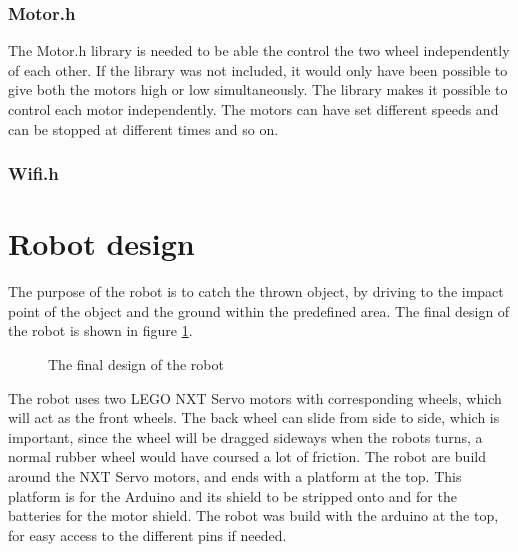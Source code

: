 \subsubsection{Motor.h}
\label{sec:Motor.h}
The Motor.h library is needed to be able the control the two wheel independently of each other. If the library was not included, it would only have been possible to give both the motors high or low simultaneously. The library makes it possible to control each motor independently. The motors can have set different speeds and can be stopped at different times and so on. 

\subsubsection{Wifi.h}
\label{sec:Wifi.h}



\section{Robot design}
\label{sec:Robot design}
The purpose of the robot is to catch the thrown object, by driving to the impact point of the object and the ground within the predefined area. The final design of the robot is shown in figure \ref{robot}.

\begin{figure}[h]
	\centering
	\caption{The final design of the robot}
	\label{robot}
\end{figure}

The robot uses two LEGO NXT Servo motors with corresponding wheels, which will act as the front wheels. The back wheel can slide from side to side, which is important, since the wheel will be dragged sideways when the robots turns, a normal rubber wheel would have coursed a lot of friction. 
The robot are build around the NXT Servo motors, and ends with a platform at the top. This platform is for the Arduino and its shield to be stripped onto and for the batteries for the motor shield. 
The robot was build with  the arduino at the top, for easy access to the different pins if needed. 

